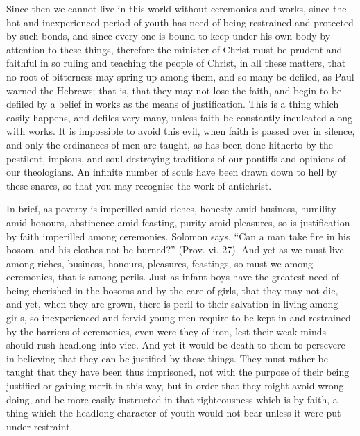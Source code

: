 Since then we cannot live in this world without ceremonies and works,
since the hot and inexperienced period of youth has need of being
restrained and protected by such bonds, and since every one is bound to
keep under his own body by attention to these things, therefore the
minister of Christ must be prudent and faithful in so ruling and teaching
the people of Christ, in all these matters, that no root of bitterness may
spring up among them, and so many be defiled, as Paul warned the Hebrews;
that is, that they may not lose the faith, and begin to be defiled by a
belief in works as the means of justification. This is a thing which
easily happens, and defiles very many, unless faith be constantly
inculcated along with works. It is impossible to avoid this evil, when
faith is passed over in silence, and only the ordinances of men are
taught, as has been done hitherto by the pestilent, impious, and
soul-destroying traditions of our pontiffs and opinions of our
theologians. An infinite number of souls have been drawn down to hell by
these snares, so that you may recognise the work of antichrist.

In brief, as poverty is imperilled amid riches, honesty amid business,
humility amid honours, abstinence amid feasting, purity amid pleasures, so
is justification by faith imperilled among ceremonies. Solomon says, ``Can
a man take fire in his bosom, and his clothes not be burned?'' (Prov. vi.
27). And yet as we must live among riches, business, honours, pleasures,
feastings, so must we among ceremonies, that is among perils. Just as
infant boys have the greatest need of being cherished in the bosoms and by
the care of girls, that they may not die, and yet, when they are grown,
there is peril to their salvation in living among girls, so inexperienced
and fervid young men require to be kept in and restrained by the barriers
of ceremonies, even were they of iron, lest their weak minds should rush
headlong into vice. And yet it would be death to them to persevere in
believing that they can be justified by these things. They must rather be
taught that they have been thus imprisoned, not with the purpose of their
being justified or gaining merit in this way, but in order that they might
avoid wrong-doing, and be more easily instructed in that righteousness
which is by faith, a thing which the headlong character of youth would not
bear unless it were put under restraint.


